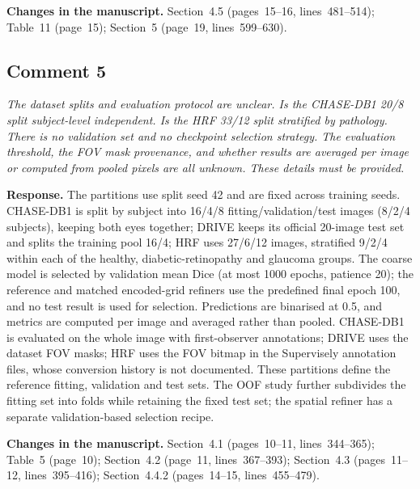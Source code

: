 \documentclass[11pt,a4paper]{article}
\newenvironment{revcomment}{\par\medskip\noindent\begin{minipage}{\linewidth}\itshape}{\end{minipage}\par\smallskip}
\begin{document}
\textbf{Changes in the manuscript.} Section~4.5 (pages~15--16, lines~481--514); Table~11 (page~15); Section~5 (page~19, lines~599--630).

\subsection*{Comment 5}
\begin{revcomment}The dataset splits and evaluation protocol are unclear. Is the CHASE-DB1 20/8 split subject-level independent. Is the HRF 33/12 split stratified by pathology. There is no validation set and no checkpoint selection strategy. The evaluation threshold, the FOV mask provenance, and whether results are averaged per image or computed from pooled pixels are all unknown. These details must be provided.\end{revcomment}
\textbf{Response.} The partitions use split seed 42 and are fixed across training seeds. CHASE-DB1 is split by subject into 16/4/8 fitting/validation/test images (8/2/4 subjects), keeping both eyes together; DRIVE keeps its official 20-image test set and splits the training pool 16/4; HRF uses 27/6/12 images, stratified 9/2/4 within each of the healthy, diabetic-retinopathy and glaucoma groups. The coarse model is selected by validation mean Dice (at most 1000 epochs, patience 20); the reference and matched encoded-grid refiners use the predefined final epoch 100, and no test result is used for selection. Predictions are binarised at 0.5, and metrics are computed per image and averaged rather than pooled. CHASE-DB1 is evaluated on the whole image with first-observer annotations; DRIVE uses the dataset FOV masks; HRF uses the FOV bitmap in the Supervisely annotation files, whose conversion history is not documented. These partitions define the reference fitting, validation and test sets. The OOF study further subdivides the fitting set into folds while retaining the fixed test set; the spatial refiner has a separate validation-based selection recipe.

\textbf{Changes in the manuscript.} Section~4.1 (pages~10--11, lines~344--365); Table~5 (page~10); Section~4.2 (page~11, lines~367--393); Section~4.3 (pages~11--12, lines~395--416); Section~4.4.2 (pages~14--15, lines~455--479).
\end{document}
